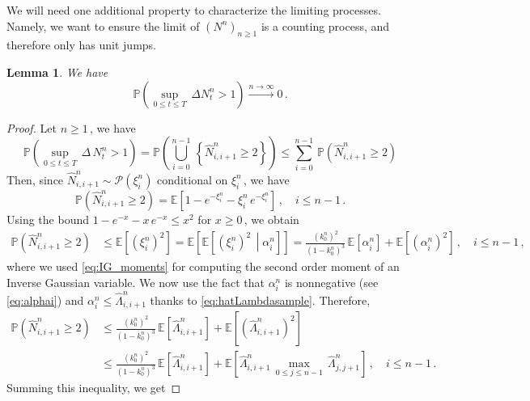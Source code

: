 \documentclass{article}
\newcommand{\1}{\mathbbm{1}}
\newtheorem{lemma}[theorem]{Lemma}
\numberwithin{equation}{section}
\begin{document}
We will need one additional property to characterize the limiting processes. Namely, we want to ensure the limit of $\left(N^n\right)_{n \geq 1}$ is a counting process, and therefore only has unit jumps.
\begin{lemma}  \label{lemma:bound_proba_jumps}
We have
$$
\mathbb P \left(\sup_{0 \leq t \leq T}\,\Delta N^n_t > 1 \right) \overset{n \to \infty}{\longrightarrow} 0\,.
$$
\end{lemma}
\begin{proof}
    Let $n \geq 1\,$, we have 
    $$
    \mathbb P \left(\sup_{ 0 \leq t \leq T}\, \Delta\,N^n_t > 1 \right) = \mathbb P \left(\bigcup_{i = 0}^{n-1}\, \left\{\widehat N^n_{i,i+1} \geq 2 \right\} \right) \leq \sum_{i = 0}^{n-1}\, \mathbb P \left(\widehat N^n_{i,i+1} \geq 2 \right)
    $$
    Then, since $\widehat N^n_{i,i+1} \sim \mathcal P \left( \xi^n_i \right)$ conditional on $\xi^n_i\,$, we have 
    $$
    \mathbb P \left(\widehat N^n_{i,i+1} \geq 2 \right) = \mathbb E \left[1 - e^{- \xi^n_i} -  \xi^n_i\, e^{- \xi^n_i} \right]\,, \quad i \leq n-1\,.
    $$
    Using the bound $1 - e^{-x} - x\,e^{-x} \leq x^2$ for $x \geq 0\,$, we obtain
    \begin{align*}
        \mathbb P \left(\widehat N^n_{i,i+1} \geq 2\right) &\leq \mathbb E \left[\left(\xi^n_i\right)^2 \right] = \mathbb E \left[\mathbb E \left[ \left(\xi^n_i\right)^2\,\middle | \alpha^n_i\right] \right] = \frac{\left(k_0^n\right)^2}{\left(1 - k_0^n\right)^3}\, \mathbb E \left[ \alpha^n_i\right] + \mathbb E \left[\left(\alpha^n_i\right)^2\right]\,, \quad i \leq n-1\,,
    \end{align*}
    where we used \eqref{eq:IG_moments} for computing the second order moment of an Inverse Gaussian variable. We now use the fact that $\alpha^n_i$ is nonnegative (see \eqref{eq:alphai}) and $\alpha^n_i \leq \widehat \Lambda^n_{i,i+1}$ thanks to \eqref{eq:hatLambdasample}. Therefore,
    \begin{align*}
    \mathbb P \left(\widehat N^n_{i,i+1} \geq 2 \right) &\leq \frac{\left(k_0^n\right)^2}{\left(1 - k_0^n\right)^3}\, \mathbb E \left[\widehat \Lambda^n_{i,i+1} \right] + \mathbb E \left[\left(\widehat \Lambda^n_{i,i+1}\right)^2 \right] \\
    &\leq \frac{\left(k_0^n\right)^2}{\left(1 - k_0^n\right)^3}\, \mathbb E \left[\widehat \Lambda^n_{i,i+1} \right] + \mathbb E \left[\widehat \Lambda^n_{i,i+1}\,\max_{0 \leq j \leq n-1}\, \widehat \Lambda^n_{j,j+1} \right]\,, \quad i \leq n-1\,.
    \end{align*}
    Summing this inequality, we get

\end{proof}
\end{document}
